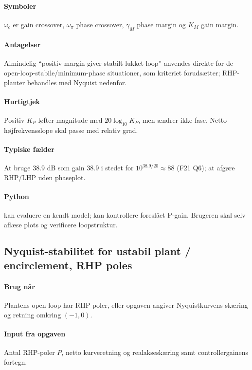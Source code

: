 \paragraph{Symboler}
\(\omega_c\) er gain crossover, \(\omega_\pi\) phase crossover,
\(\gamma_M\) phase margin og \(K_M\) gain margin.

\paragraph{Antagelser}
Almindelig ``positiv margin giver stabilt lukket loop'' anvendes direkte for de
open-loop-stabile/minimum-phase situationer, som kriteriet forudsætter; RHP-planter
behandles med Nyquist nedenfor.

\paragraph{Hurtigtjek}
Positiv \(K_P\) løfter magnitude med \(20\log_{10}K_P\), men ændrer ikke fase.
Netto højfrekvensslope skal passe med relativ grad.

\paragraph{Typiske fælder}
At bruge 38.9 dB som gain 38.9 i stedet for \(10^{38.9/20}\approx88\) (F21 Q6);
at afgøre RHP/LHP uden phaseplot.

\paragraph{Python}
 kan evaluere en kendt model;
 kan kontrollere foreslået P-gain. Brugeren skal
selv aflæse plots og verificere loopstruktur.

\subsection{Nyquist-stabilitet for ustabil plant / encirclement, RHP poles}
\label{sec:nyquist}

\paragraph{Brug når}
Plantens open-loop har RHP-poler, eller opgaven angiver Nyquistkurvens skæring
og retning omkring \((-1,0)\).

\paragraph{Input fra opgaven}
Antal RHP-poler \(P\), netto kurveretning og realakseskæring samt controllergainens fortegn.

